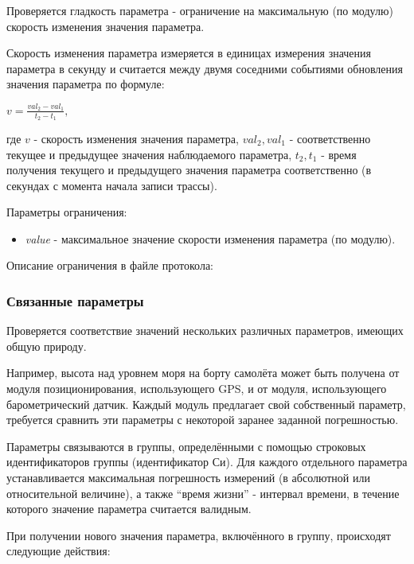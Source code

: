 Проверяется гладкость параметра - ограничение на максимальную (по модулю) 
скорость изменения значения параметра.

Скорость изменения параметра измеряется в единицах измерения значения параметра 
в секунду и считается между двумя соседними событиями обновления значения 
параметра по формуле:

$
v = \frac{val_2 - val_1}{t_2 - t_1},
$

где $v$ - скорость изменения значения параметра, $val_2, val_1$ - 
соответственно текущее и предыдущее значения наблюдаемого параметра, $t_2, t_1$ 
- время получения текущего и предыдущего значения параметра соответственно (в 
секундах с момента начала записи трассы).

Параметры ограничения:
\begin{itemize}
 \item \textit{value} - максимальное значение скорости изменения параметра (по 
модулю).
\end{itemize}

Описание ограничения в файле протокола:




\subsubsection{Связанные параметры}

Проверяется соответствие значений нескольких различных параметров, имеющих 
общую природу.

Например, высота над уровнем моря на борту самолёта может быть получена от 
модуля позиционирования, использующего GPS, и от модуля, использующего 
барометрический датчик. Каждый модуль предлагает свой собственный параметр, 
требуется сравнить эти параметры с некоторой заранее заданной погрешностью.

Параметры связываются в группы, определёнными с помощью 
строковых идентификаторов группы (идентификатор Си). Для каждого отдельного 
параметра устанавливается максимальная погрешность измерений (в абсолютной или 
относительной величине), а также ``время жизни'' - интервал времени, в течение 
которого значение параметра считается валидным.

При получении нового значения параметра, включённого в группу, происходят 
следующие действия:

